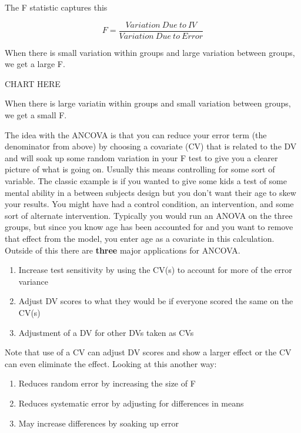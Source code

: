 \documentclass[]{book}
\providecommand{\tightlist}{%
  \setlength{\itemsep}{0pt}\setlength{\parskip}{0pt}}
\theoremstyle{definition}
\theoremstyle{definition}
\theoremstyle{definition}
\theoremstyle{remark}
\begin{document}
The F statistic captures this

\[ F = \frac{Variation\ Due\ to\ IV}{Variation\ Due\ to\ Error} \]

When there is small variation within groups and large variation between
groups, we get a large F.

CHART HERE

When there is large variatin within groups and small variation between
groups, we get a small F.

The idea with the ANCOVA is that you can reduce your error term (the
denominator from above) by choosing a covariate (CV) that is related to
the DV and will soak up some random variation in your F test to give you
a clearer picture of what is going on. Usually this means controlling
for some sort of variable. The classic example is if you wanted to give
some kids a test of some mental ability in a between subjects design but
you don't want their age to skew your results. You might have had a
control condition, an intervention, and some sort of alternate
intervention. Typically you would run an ANOVA on the three groups, but
since you know age has been accounted for and you want to remove that
effect from the model, you enter age as a covariate in this calculation.
Outside of this there are \textbf{three} major applications for ANCOVA.

\begin{enumerate}
\def\labelenumi{\arabic{enumi}.}
\tightlist
\item
  Increase test sensitivity by using the CV(s) to account for more of
  the error variance
\item
  Adjust DV scores to what they would be if everyone scored the same on
  the CV(s)
\item
  Adjustment of a DV for other DVs taken as CVs
\end{enumerate}

Note that use of a CV can adjust DV scores and show a larger effect or
the CV can even eliminate the effect. Looking at this another way:

\begin{enumerate}
\def\labelenumi{\arabic{enumi}.}
\tightlist
\item
  Reduces random error by increasing the size of F
\item
  Reduces systematic error by adjusting for differences in means
\item
  May increase differences by soaking up error
\end{enumerate}
\end{document}
